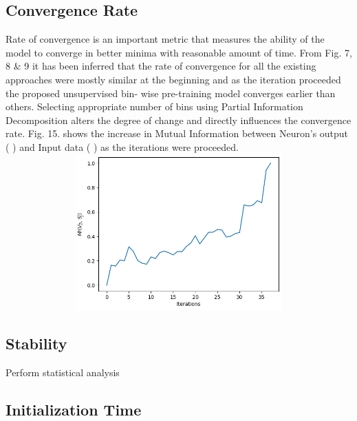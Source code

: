 \documentclass{article}
\begin{document}
\subsection{Convergence Rate}
Rate of convergence is an important metric that measures the ability of the model to
converge in better minima with reasonable amount of time. From Fig. 7, 8 \& 9 it has
been inferred that the rate of convergence for all the existing approaches were mostly
similar at the beginning and as the iteration proceeded the proposed unsupervised bin-
wise pre-training model converges earlier than others. Selecting appropriate number of
bins using Partial Information Decomposition alters the degree of change and directly
influences the convergence rate. Fig. 15. shows the increase in Mutual Information
between Neuron’s output ( ) and Input data ( ) as the iterations were proceeded.
\includegraphics[width=14cm, height=6cm]{fig15}

\subsection{Stability}
Perform statistical analysis

\subsection{Initialization Time}
\end{document}

